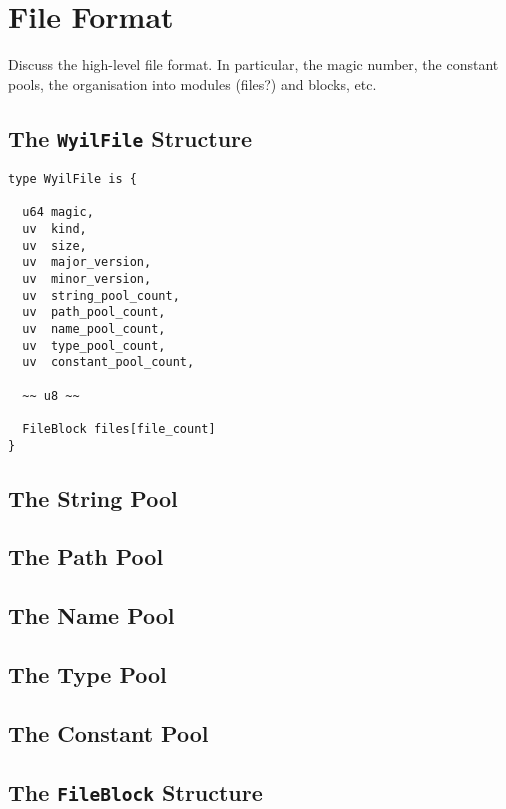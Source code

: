 \chapter{File Format}
Discuss the high-level file format.  In particular, the magic number, the constant pools, the organisation into modules (files?) and blocks, etc.

\section{The {\tt WyilFile} Structure}

\begin{lstlisting}
type WyilFile is {

  u64 magic,
  uv  kind,
  uv  size,
  uv  major_version,
  uv  minor_version,
  uv  string_pool_count,
  uv  path_pool_count,
  uv  name_pool_count,
  uv  type_pool_count,
  uv  constant_pool_count,

  ~~ u8 ~~

  FileBlock files[file_count]
}
\end{lstlisting}

\section{The String Pool}

\section{The Path Pool}

\section{The Name Pool}

\section{The Type Pool}

\section{The Constant Pool}

\section{The {\tt FileBlock} Structure}